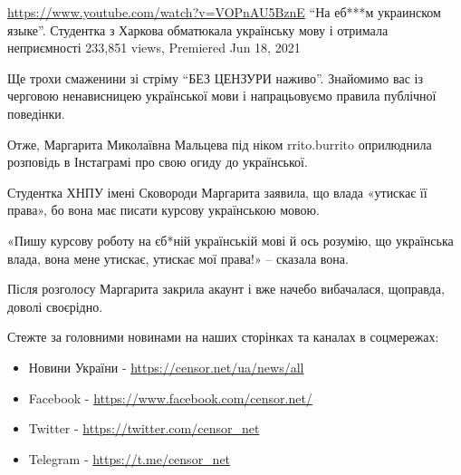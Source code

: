 
 
 
 
 
\url{https://www.youtube.com/watch?v=VOPnAU5BznE}
\enquote{На еб***м украинском языке}. Студентка з Харкова обматюкала українську мову і отримала неприємності
233,851 views, Premiered Jun 18, 2021

Ще трохи смаженини зі стріму \enquote{БЕЗ ЦЕНЗУРИ наживо}. Знайомимо вас із
черговою ненависницею української мови і напрацьовуємо правила публічної
поведінки.

Отже, Маргарита Миколаївна Мальцева під ніком rrito.burrito оприлюднила розповідь в Інстаграмі про свою огиду до української.

Студентка ХНПУ імені Сковороди Маргарита заявила, що влада «утискає її права»,
бо вона має писати курсову українською мовою.

«Пишу курсову роботу на єб*ній українській мові й ось розумію, що українська
влада, вона мене утискає, утискає мої права!» – сказала вона.

Після розголосу Маргарита закрила акаунт і вже начебо вибачалася, щоправда, доволі своєрідно.

Стежте за головними новинами на наших сторінках та каналах в соцмережах:
\begin{itemize}
  \item Новини України - \url{https://censor.net/ua/news/all}   
  \item Facebook - \url{https://www.facebook.com/censor.net/}   
  \item Twitter - \url{https://twitter.com/censor_net}   
  \item Telegram - \url{https://t.me/censor_net}
\end{itemize}


